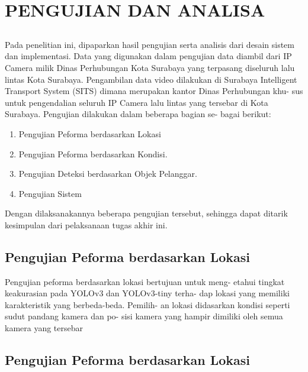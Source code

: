 \chapter{PENGUJIAN DAN ANALISA}
\vspace{1ex}

\section*{}
Pada penelitian ini, dipaparkan hasil pengujian serta analisis dari desain sistem dan implementasi.  Data yang digunakan dalam pengujian data diambil dari IP Camera milik Dinas Perhubungan Kota Surabaya yang terpasang diseluruh lalu lintas Kota Surabaya. Pengambilan data video dilakukan di Surabaya Intelligent Transport System (SITS) dimana merupakan kantor Dinas Perhubungan khu- sus untuk pengendalian seluruh IP Camera lalu lintas yang tersebar di Kota Surabaya. Pengujian dilakukan dalam beberapa bagian se- bagai berikut:
\vspace{1ex}
\begin{enumerate}[nolistsep]
	\item Pengujian Peforma berdasarkan Lokasi
	\item Pengujian Peforma berdasarkan Kondisi.
	\item Pengujian Deteksi berdasarkan Objek Pelanggar.
	\item Pengujian Sistem
	
	\vspace{1ex}

\end{enumerate}
Dengan dilaksanakannya beberapa pengujian tersebut, sehingga dapat ditarik kesimpulan dari pelaksanaan tugas akhir ini.
\vspace{1ex}

\section{Pengujian Peforma berdasarkan Lokasi}
\vspace{1ex}

Pengujian peforma berdasarkan lokasi bertujuan untuk meng- etahui tingkat keakurasian pada YOLOv3 dan YOLOv3-tiny terha- dap lokasi yang memiliki karakteristik yang berbeda-beda. Pemilih- an lokasi didasarkan kondisi seperti sudut pandang kamera dan po- sisi kamera yang hampir dimiliki oleh semua kamera yang tersebar

\section{Pengujian Peforma berdasarkan Lokasi}
\vspace{1ex}

